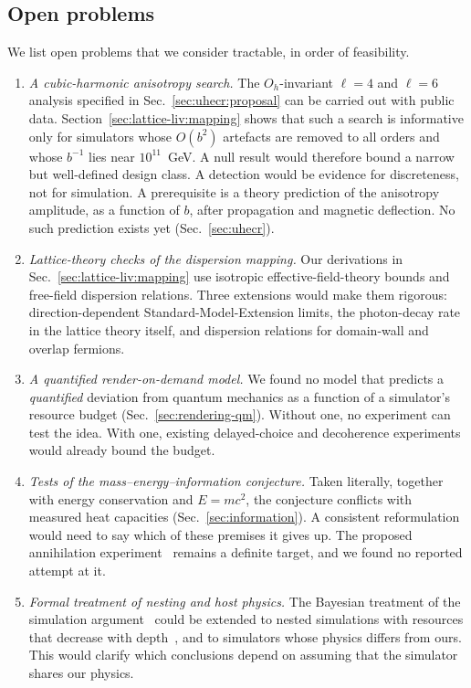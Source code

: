 \subsection{Open problems}
\label{sec:discussion:open}

We list open problems that we consider tractable, in order of feasibility.

\begin{enumerate}
\item \emph{A cubic-harmonic anisotropy search.} The $O_h$-invariant $\ell=4$ and $\ell=6$ analysis specified in Sec.~\ref{sec:uhecr:proposal} can be carried out with public data. Section~\ref{sec:lattice-liv:mapping} shows that such a search is informative only for simulators whose $O(b^2)$ artefacts are removed to all orders and whose $b^{-1}$ lies near $10^{11}$~GeV. A null result would therefore bound a narrow but well-defined design class. A detection would be evidence for discreteness, not for simulation. A prerequisite is a theory prediction of the anisotropy amplitude, as a function of $b$, after propagation and magnetic deflection. No such prediction exists yet (Sec.~\ref{sec:uhecr}).
\item \emph{Lattice-theory checks of the dispersion mapping.} Our derivations in Sec.~\ref{sec:lattice-liv:mapping} use isotropic effective-field-theory bounds and free-field dispersion relations. Three extensions would make them rigorous: direction-dependent Standard-Model-Extension limits, the photon-decay rate in the lattice theory itself, and dispersion relations for domain-wall and overlap fermions.
\item \emph{A quantified render-on-demand model.} We found no model that predicts a \emph{quantified} deviation from quantum mechanics as a function of a simulator's resource budget (Sec.~\ref{sec:rendering-qm}). Without one, no experiment can test the idea. With one, existing delayed-choice and decoherence experiments would already bound the budget.
\item \emph{Tests of the mass--energy--information conjecture.} Taken literally, together with energy conservation and $E=mc^2$, the conjecture conflicts with measured heat capacities (Sec.~\ref{sec:information}). A consistent reformulation would need to say which of these premises it gives up. The proposed annihilation experiment~\cite{Vopson2022experimental} remains a definite target, and we found no reported attempt at it.
\item \emph{Formal treatment of nesting and host physics.} The Bayesian treatment of the simulation argument~\cite{Kipping2020bayesian} could be extended to nested simulations with resources that decrease with depth~\cite{Carroll2016maybe}, and to simulators whose physics differs from ours. This would clarify which conclusions depend on assuming that the simulator shares our physics.
\end{enumerate}

